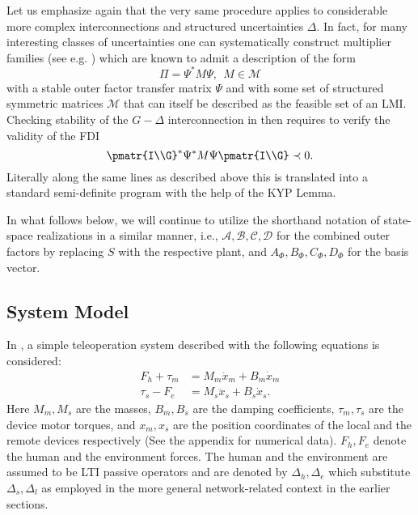 Let us emphasize again that the very same procedure applies to considerable more complex interconnections and structured uncertainties $\Delta$. In fact, for many interesting classes of uncertainties one can systematically construct multiplier families (see e.g. \cite{megretski}) which are known to admit a description of the form
\begin{equation*} \Pi = \Psi^*M\Psi,\ \ M\in{\mathcal{M}}\end{equation*}
with a stable outer factor transfer matrix $\Psi$ and with some set of structured symmetric matrices ${\mathcal{M}}$ that can itself be described as the feasible set of an LMI. Checking stability
of the $G-\Delta$ interconnection in  then requires to verify the validity of the FDI
\begin{equation*}
\pmatr{I\\G}^*\Psi^*{M}\Psi\pmatr{I\\G} \prec 0.
\end{equation*}
Literally along the same lines as described above this is translated into a standard semi-definite program with the help of the KYP Lemma.

In what follows below, we will continue to utilize the shorthand notation of state-space realizations in a similar manner, i.e., $\mathcal{A,B,C,D}$ for the combined outer factors by replacing $S$ with the respective plant, and $A_\Phi,B_\Phi,C_\Phi,D_\Phi$ for the basis vector.


\subsection{System Model}
In \cite{willaert}, a simple teleoperation system described with the following equations is considered:
\begin{align*}
F_h+\tau_m &= M_m \ddot{x}_m + B_m \dot{x}_m\\
\tau_s -F_e &= M_s \ddot{x}_s + B_s \dot{x}_s.
\end{align*}
Here $M_m,M_s$ are the masses, $B_m,B_s$ are the damping coefficients, $\tau_m,\tau_s$ are the device motor torques, {and} $x_m,x_s$ are the position coordinates of the local and the remote devices respectively (See {the} appendix for numerical data). $F_h,F_e$  denote the human and the environment forces. The human and the environment are assumed to be LTI passive operators {and} {are denoted by $\Delta_h,\Delta_e$ which substitute $\Delta_s,\Delta_l$ as employed in the more general network-related context in the earlier sections.}

